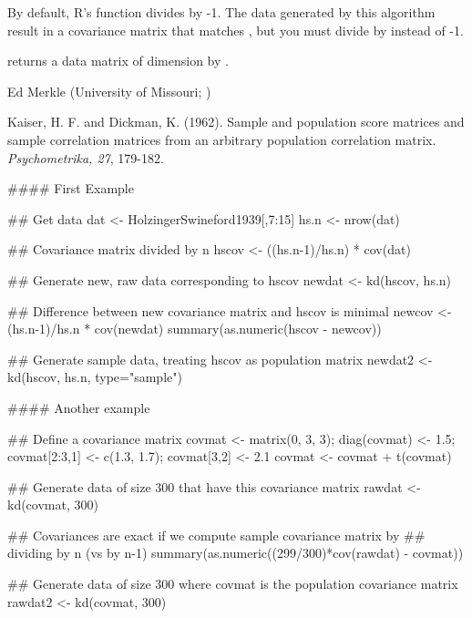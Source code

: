 \documentclass[a4paper]{book}
\begin{document}
%
\begin{Details}\relax
By default, R's  function divides by -1.  The data
generated by this algorithm result in a covariance matrix that matches
, but you must divide by  instead of -1.
\end{Details}
%
\begin{Value}
 returns a data matrix of dimension  by .
\end{Value}
%
\begin{Author}\relax
Ed Merkle (University of Missouri; )
\end{Author}
%
\begin{References}\relax
Kaiser, H. F. and Dickman, K. (1962).  Sample and population score
matrices and sample correlation matrices from an arbitrary population
correlation matrix.  \emph{Psychometrika, 27}, 179-182.
\end{References}
%
\begin{Examples}
\begin{ExampleCode}
#### First Example

## Get data
dat <- HolzingerSwineford1939[,7:15]
hs.n <- nrow(dat)

## Covariance matrix divided by n
hscov <- ((hs.n-1)/hs.n) * cov(dat)

## Generate new, raw data corresponding to hscov
newdat <- kd(hscov, hs.n)

## Difference between new covariance matrix and hscov is minimal
newcov <- (hs.n-1)/hs.n * cov(newdat)
summary(as.numeric(hscov - newcov))

## Generate sample data, treating hscov as population matrix
newdat2 <- kd(hscov, hs.n, type="sample")

#### Another example

## Define a covariance matrix
covmat <- matrix(0, 3, 3); diag(covmat) <- 1.5; covmat[2:3,1] <- c(1.3, 1.7); covmat[3,2] <- 2.1
covmat <- covmat + t(covmat)

## Generate data of size 300 that have this covariance matrix
rawdat <- kd(covmat, 300)

## Covariances are exact if we compute sample covariance matrix by
## dividing by n (vs by n-1)
summary(as.numeric((299/300)*cov(rawdat) - covmat))

## Generate data of size 300 where covmat is the population covariance matrix
rawdat2 <- kd(covmat, 300)
\end{ExampleCode}
\end{Examples}
\end{document}
